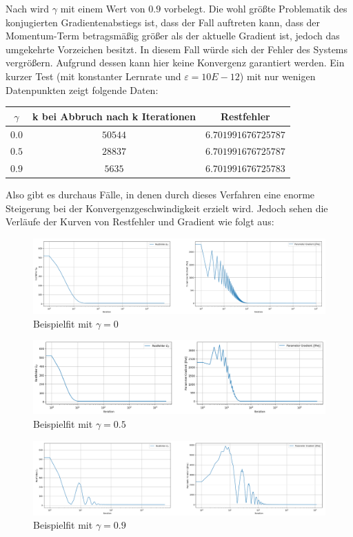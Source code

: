 \documentclass{article}
\theoremstyle{plain} %
\theoremstyle{definition} %
\begin{document}
Nach \cite[S. 110]{Lippe} wird $\gamma$ mit einem Wert von $0.9$ vorbelegt. Die wohl größte Problematik des konjugierten Gradientenabstiegs ist, dass der Fall auftreten kann, dass der Momentum-Term betragsmäßig größer als der aktuelle Gradient ist, jedoch das umgekehrte Vorzeichen besitzt. In diesem Fall würde sich der Fehler des Systems vergrößern. Aufgrund dessen kann hier keine Konvergenz garantiert werden.
Ein kurzer Test (mit konstanter Lernrate und $\varepsilon=10E-12$) mit nur wenigen Datenpunkten zeigt folgende Daten:

\begin{tabular}{ccc}
  \toprule
  $\gamma$ & k bei Abbruch nach k Iterationen & Restfehler\\
  \midrule
  $0.0$ & $50544$ & $6.701991676725787$\\
  $0.5$ & $28837$ & $6.701991676725787$\\
  $0.9$ & $5635$ & $6.701991676725783$\\
\end{tabular}

Also gibt es durchaus Fälle, in denen durch dieses Verfahren eine enorme Steigerung bei der Konvergenzgeschwindigkeit erzielt wird. Jedoch sehen die Verläufe der Kurven von Restfehler und Gradient wie folgt aus:

\begin{figure}[H]
  \centering
  \includegraphics[width=\textwidth]{Momentum_0_0_Error_10e-12_Crop}
  \caption{Beispielfit mit $\gamma=0$}
\end{figure}
\begin{figure}[H]
  \centering
  \includegraphics[width=\textwidth]{Momentum_0_5_Error_10e-12_Crop}
  \caption{Beispielfit mit $\gamma=0.5$}
\end{figure}
\begin{figure}[H]
  \centering
  \includegraphics[width=\textwidth]{Momentum_0_9_Error_10e-12_Crop}
  \caption{Beispielfit mit $\gamma=0.9$}
\end{figure}
\end{document}
